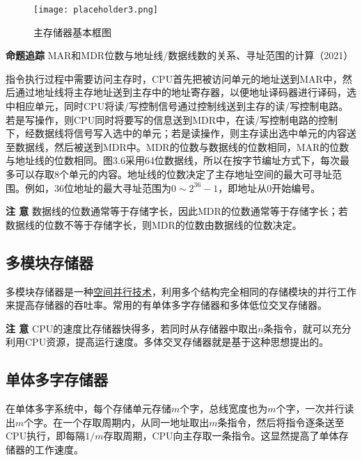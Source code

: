 \documentclass[UTF8]{ctexart}
\begin{document}
	\begin{figure}[h]
		\centering
		\caption{主存储器基本框图}
		\label{fig:main_memory_diagram}
		\texttt{[image: placeholder3.png]} 
	\end{figure}
	
	\begin{tcolorbox}[colframe=black, colback=white]
		\kaishu \textbf{命题追踪} \quad MAR和MDR位数与地址线/数据线数的关系、寻址范围的计算（2021）
	\end{tcolorbox}
	
	指令执行过程中需要访问主存时，CPU首先把被访问单元的地址送到MAR中，然后通过地址线将主存地址送到主存中的地址寄存器，以便地址译码器进行译码，选中相应单元，同时CPU将读/写控制信号通过控制线送到主存的读/写控制电路。若是写操作，则CPU同时将要写的信息送到MDR中，在读/写控制电路的控制下，经数据线将信号写入选中的单元；若是读操作，则主存读出选中单元的内容送至数据线，然后被送到MDR中。MDR的位数与数据线的位数相同，MAR的位数与地址线的位数相同。图3.6采用64位数据线，所以在按字节编址方式下，每次最多可以存取8个单元的内容。地址线的位数决定了主存地址空间的最大可寻址范围。例如，36位地址的最大寻址范围为$0 \sim 2^{36}-1$，即地址从0开始编号。
	
	\begin{tcolorbox}[colframe=black, colback=white]
		\kaishu \textbf{注 意} \quad 数据线的位数通常等于存储字长，因此MDR的位数通常等于存储字长；若数据线的位数不等于存储字长，则MDR的位数由数据线的位数决定。
	\end{tcolorbox}
	
	\subsection{多模块存储器}
	多模块存储器是一种\underline{空间并行技术}，利用多个结构完全相同的存储模块的并行工作来提高存储器的吞吐率。常用的有单体多字存储器和多体低位交叉存储器。
	
	\begin{tcolorbox}[colframe=black, colback=white]
		\kaishu \textbf{注 意} \quad CPU的速度比存储器快得多，若同时从存储器中取出$n$条指令，就可以充分利用CPU资源，提高运行速度。多体交叉存储器就是基于这种思想提出的。
	\end{tcolorbox}
	
	\subsection{单体多字存储器}
	在单体多字系统中，每个存储单元存储$m$个字，总线宽度也为$m$个字，一次并行读出$m$个字。在一个存取周期内，从同一地址取出$m$条指令，然后将指令逐条送至CPU执行，即每隔$1/m$存取周期，CPU向主存取一条指令。这显然提高了单体存储器的工作速度。
	
\end{document}
